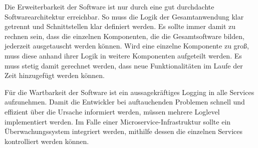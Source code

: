 Die Erweiterbarkeit der Software ist nur durch eine gut durchdachte Softwarearchitektur erreichbar.
So muss die Logik der Gesamtanwendung klar getrennt und Schnittstellen klar definiert werden. Es sollte
immer damit zu rechnen sein, dass die einzelnen Komponenten, die die Gesamtsoftware bilden, jederzeit
ausgetauscht werden können. Wird eine einzelne Komponente zu groß, muss diese anhand ihrer Logik in weitere
Komponenten aufgeteilt werden. Es muss stetig damit gerechnet werden, dass neue Funktionalitäten im
Laufe der Zeit hinzugefügt werden können.

Für die Wartbarkeit der Software ist ein aussagekräftiges Logging in alle Services aufzunehmen.
Damit die Entwickler bei auftauchenden Problemen schnell und effizient über die Ursache informiert werden,
müssen mehrere Loglevel implementiert werden. Im Falle einer Microservice-Infrastruktur sollte ein Überwachungssystem
integriert werden, mithilfe dessen die einzelnen Services kontrolliert werden können.
